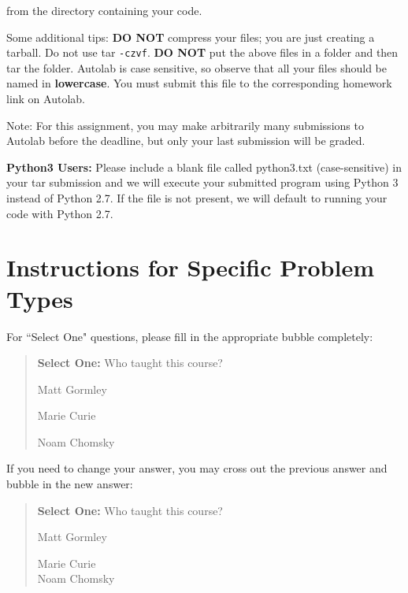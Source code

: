 \documentclass[12pt]{article}
\begin{document}
from the directory containing your code.

Some additional tips: \textbf{DO NOT} compress your files; you are just creating a tarball. Do not use tar \texttt{-czvf}. \textbf{DO NOT} put the above files in a folder and then tar the folder. Autolab is case sensitive, so observe that all your files should be named in \textbf{lowercase}. You must submit this file to the corresponding homework link on Autolab.

Note: For this assignment, you may make arbitrarily many submissions to Autolab before the deadline, but only your last submission will be graded.


 \begin{notebox}
  {\bf Python3 Users:} Please include a blank file called python3.txt (case-sensitive) in your tar submission and we will execute your submitted program using Python 3 instead of Python 2.7. If the file is not present, we will default to running your code with Python 2.7.
 \end{notebox}


\clearpage



\section*{Instructions for Specific Problem Types}

For ``Select One" questions, please fill in the appropriate bubble completely:

\begin{quote}
\textbf{Select One:} Who taught this course?
\begin{list}{}
     \item\CIRCLE{} Matt Gormley
     \item\Circle{} Marie Curie
     \item\Circle{} Noam Chomsky
\end{list}
\end{quote}

If you need to change your answer, you may cross out the previous answer and bubble in the new answer:

\begin{quote}
\textbf{Select One:} Who taught this course?
\begin{list}{}
     \item\CIRCLE{} Matt Gormley
     \item\Circle{} Marie Curie\\
     \xcancel{\CIRCLE}{} Noam Chomsky
\end{list}
\end{quote}
\end{document}
